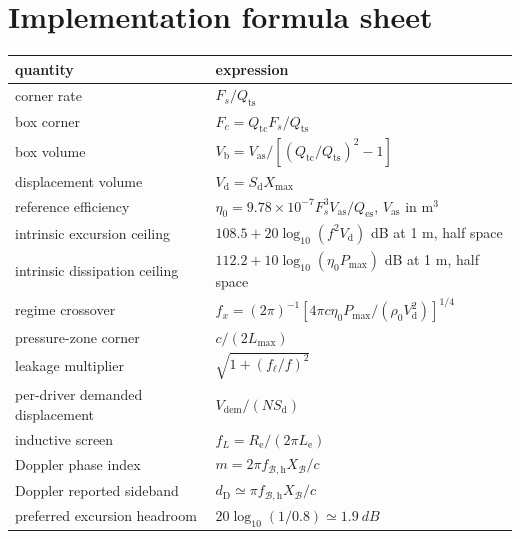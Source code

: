 \documentclass[11pt,a4paper]{article}
\numberwithin{equation}{section}
\newcommand{\Sd}{S_{\mathrm{d}}}
\newcommand{\Xmax}{X_{\mathrm{max}}}
\newcommand{\Vd}{V_{\mathrm{d}}}
\renewcommand{\Re}{R_{\mathrm{e}}}
\newcommand{\Le}{L_{\mathrm{e}}}
\newcommand{\Qes}{Q_{\mathrm{es}}}
\newcommand{\Qts}{Q_{\mathrm{ts}}}
\newcommand{\Qtc}{Q_{\mathrm{tc}}}
\newcommand{\Vas}{V_{\mathrm{as}}}
\newcommand{\Vb}{V_{\mathrm{b}}}
\newcommand{\Pmax}{P_{\mathrm{max}}}
\begin{document}
\section{Implementation formula sheet}
\label{app:formula-sheet}

\begin{center}
\small
\begin{tabular}{@{}p{4.2cm}p{9.2cm}@{}}
\toprule
quantity & expression\\
\midrule
corner rate & $F_s/\Qts$\\
box corner & $F_c=\Qtc F_s/\Qts$\\
box volume &
$\Vb=\Vas/[(\Qtc/\Qts)^2-1]$\\
displacement volume & $\Vd=\Sd\Xmax$\\
reference efficiency &
$\eta_0=9.78\times10^{-7}F_s^3\Vas/\Qes$,
$\Vas$ in m$^3$\\
intrinsic excursion ceiling &
$108.5+20\log_{10}(f^2\Vd)$ dB at 1 m, half space\\
intrinsic dissipation ceiling &
$112.2+10\log_{10}(\eta_0\Pmax)$ dB at 1 m, half space\\
regime crossover &
$f_x=(2\pi)^{-1}[4\pi c\eta_0\Pmax/(\rho_0\Vd^2)]^{1/4}$\\
pressure-zone corner & $c/(2L_{\max})$\\
leakage multiplier &
$\sqrt{1+(f_\ell/f)^2}$\\
per-driver demanded displacement &
$V_{\mathrm{dem}}/(N\Sd)$\\
inductive screen & $f_L=\Re/(2\pi\Le)$\\
Doppler phase index &
$m=2\pi f_{\mathcal B,\mathrm h}X_{\mathcal B}/c$\\
Doppler reported sideband &
$d_{\mathrm D}\simeq\pi f_{\mathcal B,\mathrm h}X_{\mathcal B}/c$\\
preferred excursion headroom &
$20\log_{10}(1/0.8)\simeq\SI{1.9}{dB}$\\
\bottomrule
\end{tabular}
\end{center}


\end{document}
